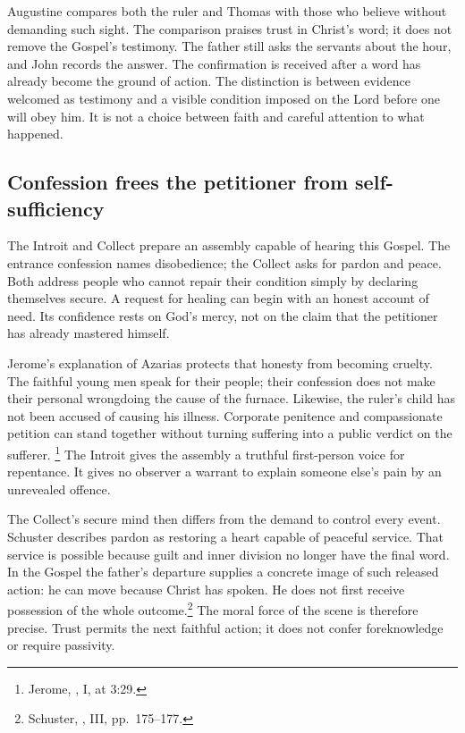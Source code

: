 Augustine compares both the ruler and Thomas with those who believe
without demanding such sight. The comparison praises trust in Christ's
word; it does not remove the Gospel's testimony. The father still asks
the servants about the hour, and John records the answer. The confirmation
is received after a word has already become the ground of action. The
distinction is between evidence welcomed as testimony and a visible
condition imposed on the Lord before one will obey him. It is not a
choice between faith and careful attention to what happened.

\subsection{Confession frees the petitioner from self-sufficiency}
The Introit and Collect prepare an assembly capable of hearing this
Gospel. The entrance confession names disobedience; the Collect asks
for pardon and peace. Both address people who cannot repair their condition
simply by declaring themselves secure. A request for healing can begin
with an honest account of need. Its confidence rests on God's mercy,
not on the claim that the petitioner has already mastered himself.

Jerome's explanation of Azarias protects that honesty from becoming
cruelty. The faithful young men speak for their people; their confession
does not make their personal wrongdoing the cause of the furnace.
Likewise, the ruler's child has not been accused of causing his illness.
Corporate penitence and compassionate petition can stand together
without turning suffering into a public verdict on the sufferer.
\footnote{Jerome, , I, at 3:29.}
The Introit gives the assembly a truthful first-person voice for repentance.
It gives no observer a warrant to explain someone else's pain by an
unrevealed offence.

The Collect's secure mind then differs from the demand to control every
event. Schuster describes pardon as restoring a heart capable of
peaceful service. That service is possible because guilt and inner
division no longer have the final word. In the Gospel the father's
departure supplies a concrete image of such released action: he can
move because Christ has spoken. He does not first receive possession of
the whole outcome.\footnote{Schuster, , III,
pp.~175--177.}
The moral force of the scene is therefore precise. Trust permits the next
faithful action; it does not confer foreknowledge or require passivity.

